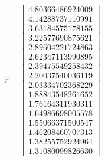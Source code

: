 \documentclass[a4paper,12pt]{article}
\begin{document}
$$ \hat{r} = \left[ \begin{array}{c}
   4.80366486924009 \\
   4.14288737110991 \\
   3.63184575178155 \\
   3.22577690875621 \\
   2.89604221724863 \\
   2.62347113990895 \\
   2.39475549258432 \\
   2.20037540036119 \\
   2.03334702368229 \\
   1.88843548261652 \\
   1.76164311930311 \\
   1.64986698005578 \\
   1.55066371500547 \\
   1.46208460707313 \\
   1.38255752924964 \\
   1.31080099826630
              \end{array}
       \right]
$$
\end{document}

